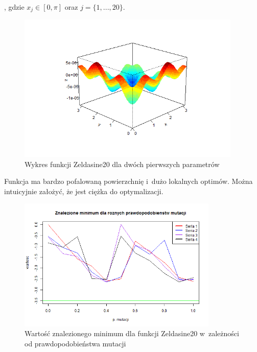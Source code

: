 \documentclass[11pt, a4paper]{article}
\newcommand{\fbi}{\leavevmode{\parindent=1em\indent}}
\begin{document}
, gdzie $ x_j \in [0, \pi]$ oraz $j = \{1, ..., 20\}$.

\begin{figure}[H]
	\begin{center}
		\includegraphics[width=0.95\textwidth]{./assets/Zeldasine201.png}
		\caption{Wykres funkcji Zeldasine20 dla dwóch pierwszych parametrów}
		\label{fig:zeldasine1}
	\end{center}
\end{figure}

\fbi
Funkcja ma bardzo pofalowaną powierzchnię i~dużo lokalnych optimów. Można intuicyjnie założyć, że jest ciężka do optymalizacji.

\begin{figure}[H]
	\begin{center}
		\includegraphics[width=0.85\textwidth]{./assets/Zeldasine202.png}
		\caption{Wartość znalezionego minimum dla funkcji Zeldasine20 w~zależności od prawdopodobieństwa mutacji}
		\label{fig:zeldasine2}
	\end{center}
\end{figure}
\end{document}
